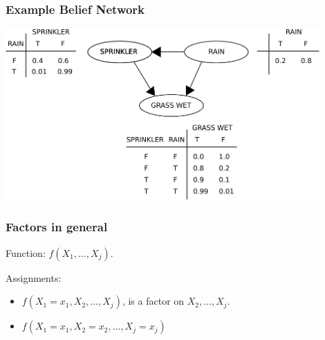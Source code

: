 \documentclass[12pt]{beamer} %
\begin{document}
                                                        \begin{frame}
                                                        \frametitle{Example Belief Network}

                                                        \begin{center}
                                                        \includegraphics[width=0.9\textwidth]{figures/uncert_fig_bayes-net-w-cpds.pdf}
                                                        \end{center}

                                                        \end{frame}


                                                        \begin{frame}
                                                        \frametitle{Factors in general}
Function: $f(X_1,\ldots,X_j)$.

Assignments:
\begin{itemize}
\item
$f(X_1=x_1,X_2,\ldots,X_j)$,
  is a factor on
  $X_2,\ldots,X_j$.
  \item
  $f(X_1=x_1,X_2=x_2,\ldots,X_j=x_j)$
  \end{itemize}
  \end{frame}
\end{document}
